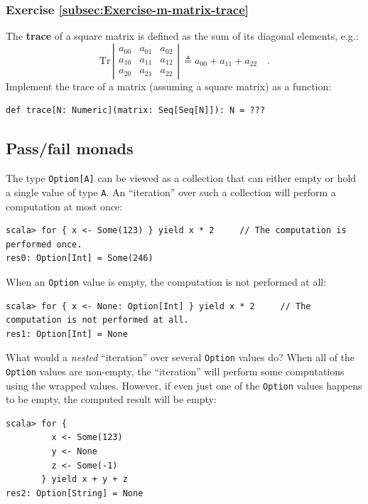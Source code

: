 \subsubsection{Exercise \label{subsec:Exercise-m-matrix-trace}\ref{subsec:Exercise-m-matrix-trace}}

The \textbf{trace} of a square matrix is
defined as the sum of its diagonal elements, e.g.:
\[
\text{Tr}\,\left|\begin{array}{ccc}
a_{00} & a_{01} & a_{02}\\
a_{10} & a_{11} & a_{12}\\
a_{20} & a_{21} & a_{22}
\end{array}\right|\,\triangleq a_{00}+a_{11}+a_{22}\quad.
\]
Implement the trace of a matrix (assuming a square matrix) as a function:
\begin{lstlisting}
def trace[N: Numeric](matrix: Seq[Seq[N]]): N = ???
\end{lstlisting}


\subsection{Pass/fail monads\label{subsec:Pass/fail-monads}}

The type \lstinline!Option[A]! can be viewed as a collection that
can either empty or hold a single value of type \lstinline!A!. An
\textsf{``}iteration\textsf{''} over such a collection will perform a computation
at most once:
\begin{lstlisting}
scala> for { x <- Some(123) } yield x * 2     // The computation is performed once.
res0: Option[Int] = Some(246) 
\end{lstlisting}
When an \lstinline!Option! value is empty, the computation is not
performed at all:
\begin{lstlisting}
scala> for { x <- None: Option[Int] } yield x * 2     // The computation is not performed at all.
res1: Option[Int] = None
\end{lstlisting}
What would a \emph{nested} \textsf{``}iteration\textsf{''} over several \lstinline!Option!
values do? When all of the \lstinline!Option! values are non-empty,
the \textsf{``}iteration\textsf{''} will perform some computations using the wrapped
values. However, if even just one of the \lstinline!Option! values
happens to be empty, the computed result will be empty:
\begin{lstlisting}
scala> for {
         x <- Some(123)
         y <- None
         z <- Some(-1)
       } yield x + y + z
res2: Option[String] = None
\end{lstlisting}

